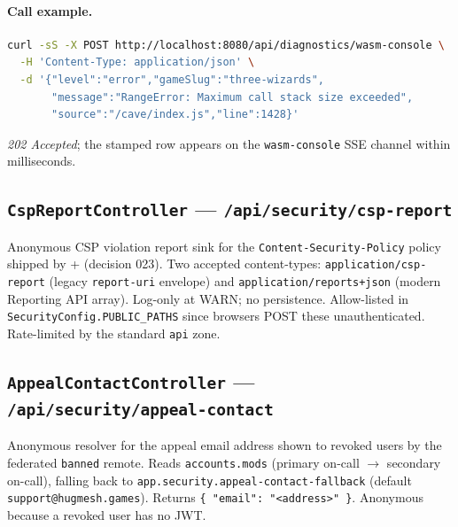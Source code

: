 
\paragraph{Call example.}
\begin{lstlisting}[language=bash]
curl -sS -X POST http://localhost:8080/api/diagnostics/wasm-console \
  -H 'Content-Type: application/json' \
  -d '{"level":"error","gameSlug":"three-wizards",
       "message":"RangeError: Maximum call stack size exceeded",
       "source":"/cave/index.js","line":1428}'
\end{lstlisting}
\textit{202 Accepted}; the stamped row appears on the
\texttt{wasm-console} SSE channel within milliseconds.

\subsection{\texttt{CspReportController} — \texttt{/api/security/csp-report}}
Anonymous CSP violation report sink for the
\texttt{Content-Security-Policy} policy shipped by
\reposrc{frontend/nginx.conf} + 
(decision 023). Two accepted content-types:
\texttt{application/csp-report} (legacy \texttt{report-uri} envelope)
and \texttt{application/reports+json} (modern Reporting API array).
Log-only at WARN; no persistence. Allow-listed in
\texttt{SecurityConfig.PUBLIC\_PATHS} since browsers POST these
unauthenticated. Rate-limited by the standard \texttt{api} zone.

\subsection{\texttt{AppealContactController} — \texttt{/api/security/appeal-contact}}
Anonymous resolver for the appeal email address shown to revoked users
by the federated \texttt{banned} remote. Reads \texttt{accounts.mods}
(primary on-call $\rightarrow$ secondary on-call), falling back to
\texttt{app.security.appeal-contact-fallback} (default
\texttt{support@hugmesh.games}). Returns
\texttt{\{ "email": "<address>" \}}. Anonymous because a revoked user
has no JWT.

